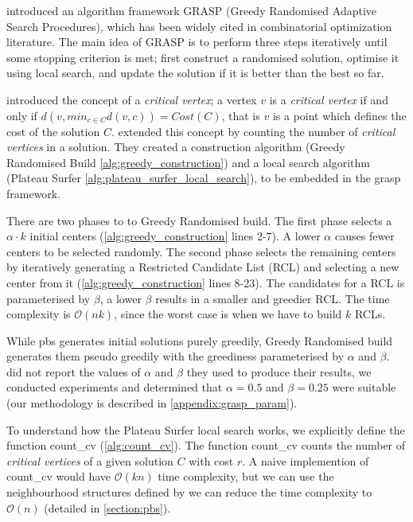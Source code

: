 \textcite{feo_greedy_1995} introduced an algorithm framework GRASP (Greedy Randomised Adaptive Search Procedures), which has been widely cited in combinatorial optimization literature. The main idea of GRASP is to perform three steps iteratively until some stopping criterion is met; first construct a randomised solution, optimise it using local search, and update the solution if it is better than the best so far.



\textcite{mladenovic_solving_2003} introduced the concept of a \emph{critical vertex}; a vertex $v$ is a \emph{critical vertex} if and only if $d(v, min_{c\in C}d(v, c))=Cost(C)$, that is $v$ is a point which defines the cost of the solution $C$. \textcite{battiti_new_2017} extended this concept by counting the number of \emph{critical vertices} in a solution. They created a construction algorithm (Greedy Randomised Build \cref{alg:greedy_construction}) and a local search algorithm (Plateau Surfer \cref{alg:plateau_surfer_local_search}), to be embedded in the \acrshort{grasp} framework.



There are two phases to to Greedy Randomised build. The first phase selects a $\alpha\cdot k$ initial centers (\cref{alg:greedy_construction} lines 2-7). A lower $\alpha$ causes fewer centers to be selected randomly. The second phase selects the remaining centers by iteratively generating a Restricted Candidate List (RCL) and selecting a new center from it (\cref{alg:greedy_construction} lines 8-23). The candidates for a RCL is parameterised by $\beta$, a lower $\beta$ results in a smaller and greedier RCL. The time complexity is $\mathcal{O}(nk)$, since the worst case is when we have to build $k$ RCLs. 

While \acrshort{pbs} generates initial solutions purely greedily, Greedy Randomised build generates them pseudo greedily with the greediness parameterised by $\alpha$ and $\beta$. \textcite{battiti_new_2017} did not report the values of $\alpha$ and $\beta$ they used to produce their results, we conducted experiments and determined that $\alpha =0.5$ and $\beta =0.25$ were suitable (our methodology is described in \cref{appendix:grasp_param}).



To understand how the Plateau Surfer local search works, we explicitly define the function count\_cv (\cref{alg:count_cv}). The function count\_cv counts the number of \emph{critical vertices} of a given solution $C$ with cost $r$. A naive implemention of count\_cv would have $\mathcal{O}(kn)$ time complexity, but we can use the neighbourhood structures defined by \textcite{mladenovic_solving_2003} we can reduce the time complexity to $\mathcal{O}(n)$ (detailed in \cref{section:pbs}). 


